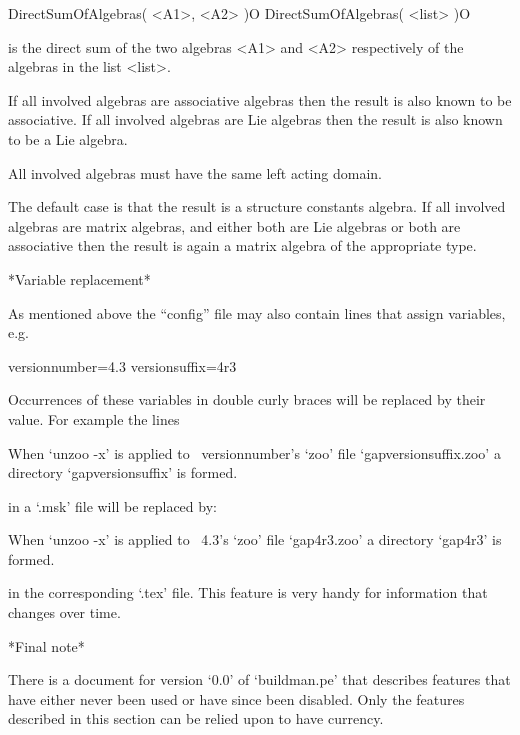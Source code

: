 \){\fmark}DirectSumOfAlgebras( <A1>, <A2> )\hfill O
\){\fmark}DirectSumOfAlgebras( <list> )\hfill O

is the direct sum of the two algebras <A1> and <A2> respectively of the
algebras in the list <list>.

If all involved algebras are associative algebras then the result is also
known to be associative.
If all involved algebras are Lie algebras then the result is also known
to be a Lie algebra.

All involved algebras must have the same left acting domain.

The default case is that the result is a structure constants algebra.
If all involved algebras are matrix algebras, and either both are Lie
algebras or both are associative then the result is again a
matrix algebra of the appropriate type.

*Variable replacement*

As mentioned above the ``config'' file may also contain lines that assign
variables, e.g.

\begintt
versionnumber=4.3
versionsuffix=4r3
\endtt

Occurrences of these variables in double curly braces will be replaced by
their value. For example the lines

\begintt
When `unzoo -x' is applied to {\GAP}~{{versionnumber}}'s `zoo' file
`gap{{versionsuffix}}.zoo' a directory `gap{{versionsuffix}}' is formed.
\endtt

in a `.msk' file will be replaced by:

\begintt
When `unzoo -x' is applied to {\GAP}~4.3's `zoo' file
`gap4r3.zoo' a directory `gap4r3' is formed.
\endtt

in the corresponding `.tex' file.
This feature is very handy for information that changes over time.

*Final note*

There is a document for version `0.0'  of  `buildman.pe'  that  describes
features that have either never been used or have  since  been  disabled.
Only the features described in this section can be relied  upon  to  have
currency.



